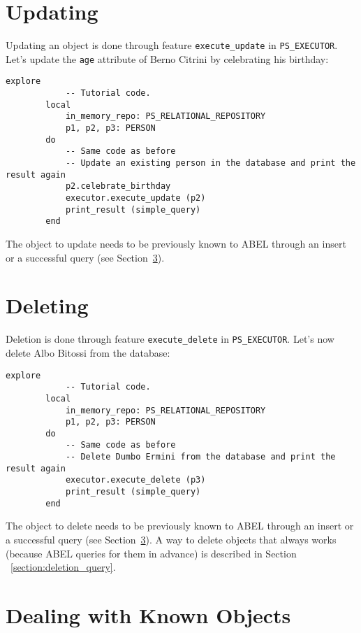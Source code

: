 \documentclass[a4paper,12pt]{report}
\begin{document}
\section{Updating}

Updating an object is done through feature \lstinline{execute_update} in \lstinline{PS_EXECUTOR}. Let's update the \lstinline{age} attribute of Berno Citrini by celebrating his birthday:

\begin{lstlisting}[language=OOSC2Eiffel, captionpos=b, caption={Printing the query result.}, label={lst:tutorial_print_result}]
	explore
			-- Tutorial code.
		local
			in_memory_repo: PS_RELATIONAL_REPOSITORY
			p1, p2, p3: PERSON
		do
			-- Same code as before
			-- Update an existing person in the database and print the result again
			p2.celebrate_birthday
			executor.execute_update (p2)
			print_result (simple_query)		
		end
\end{lstlisting}
The object to update needs to be previously known to ABEL through an insert or a successful query (see Section~\ref{section:dealing_with_known_objects}).

\section{Deleting}
\label{section:simple_delete}

Deletion is done through feature \lstinline{execute_delete} in \lstinline{PS_EXECUTOR}.
Let's now delete Albo Bitossi from the database:
\begin{lstlisting}[language=OOSC2Eiffel, captionpos=b, caption={Deleting an object.}, label={lst:tutorial_print_result}]
	explore
			-- Tutorial code.
		local
			in_memory_repo: PS_RELATIONAL_REPOSITORY
			p1, p2, p3: PERSON
		do
			-- Same code as before
			-- Delete Dumbo Ermini from the database and print the result again
			executor.execute_delete (p3)
			print_result (simple_query)
		end
\end{lstlisting}
The object to delete needs to be previously known to ABEL through an insert or a successful query (see Section~\ref{section:dealing_with_known_objects}). A way to delete objects that always works (because ABEL  queries for them in advance) is described in Section ~\ref{section:deletion_query}.
\section{Dealing with Known Objects}
\label{section:dealing_with_known_objects}
\end{document}
